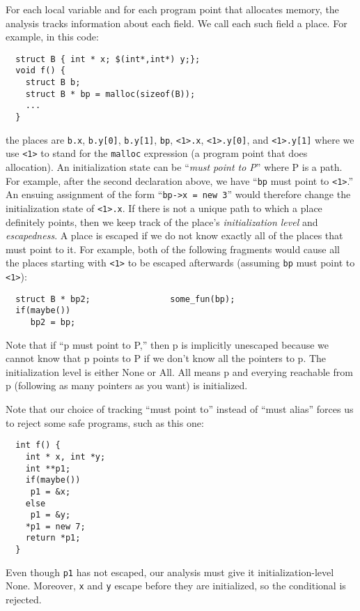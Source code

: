 For each local variable and for each program point that allocates
memory, the analysis tracks information about each field.  We call
each such field a place. For example, in this code:
\begin{verbatim}
  struct B { int * x; $(int*,int*) y;}; 
  void f() {
    struct B b;
    struct B * bp = malloc(sizeof(B));
    ...
  }
\end{verbatim}
the places are \texttt{b.x}, \texttt{b.y[0]}, \texttt{b.y[1]}, \texttt{bp},
\texttt{<1>.x}, \texttt{<1>.y[0]}, and \texttt{<1>.y[1]} where we use
\texttt{<1>} to stand for the \texttt{malloc} expression (a program point
that does allocation).  An initialization state can be ``\emph{must
  point to P}'' where P is a path.  For example, after the second
declaration above, we have ``\texttt{bp} must point to \texttt{<1>}.''  An
ensuing assignment of the form ``\texttt{bp->x = new 3}'' would therefore
change the initialization state of \texttt{<1>.x}.  If there is not a
unique path to which a place definitely points, then we keep track of
the place's \emph{initialization level} and \emph{escapedness}.  A
place is escaped if we do not know exactly all of the places that must
point to it.  For example, both of the following fragments would cause
all the places starting with \texttt{<1>} to be escaped afterwards
(assuming \texttt{bp} must point to \texttt{<1>}):
\begin{verbatim}
  struct B * bp2;                some_fun(bp);                      
  if(maybe()) 
     bp2 = bp;
\end{verbatim}

Note that if ``p must point to P,'' then p is implicitly unescaped
because we cannot know that p points to P if we don't know all the
pointers to p.  The initialization level is either None or All.
All means p and everying reachable from p (following as many pointers
as you want) is initialized.

Note that our choice of tracking ``must point to'' instead of ``must
alias'' forces us to reject some safe programs, such as this one:
\begin{verbatim}
  int f() {
    int * x, int *y;
    int **p1;
    if(maybe())
     p1 = &x;
    else
     p1 = &y;
    *p1 = new 7;
    return *p1;
  }
\end{verbatim}

Even though \texttt{p1} has not escaped, our analysis must give it
initialization-level None.  Moreover, \texttt{x} and \texttt{y} escape
before they are initialized, so the conditional is rejected.

